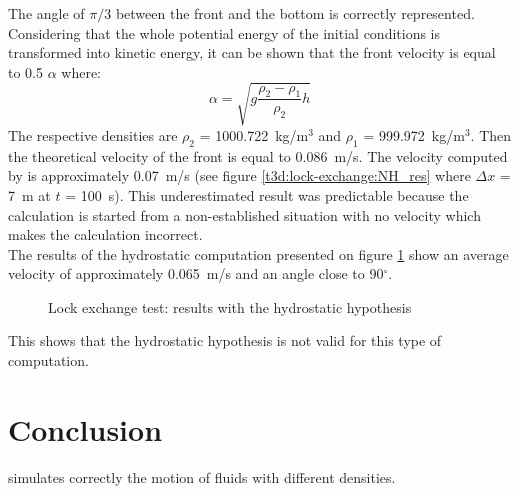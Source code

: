 The angle of $\pi/3$ between the front and the bottom is correctly
represented.\\
Considering that the whole potential energy of the initial conditions is
transformed into kinetic energy, it can be shown that the front velocity
is equal to 0.5 $\alpha$ where:
\begin{equation}
\alpha = \sqrt{g \frac{\rho_2-\rho_1}{\rho_2}h}
\end{equation}
The respective densities are $\rho_2$ = 1000.722~kg/m$^3$
and $\rho_1$ = 999.972~kg/m$^3$.
Then the theoretical velocity of the front is equal to 0.086~m/s.
The velocity computed by  is approximately 0.07~m/s
(see figure \ref{t3d:lock-exchange:NH_res} where $\Delta x$ = 7~m
at $t$ = 100~s).
This underestimated result was predictable because the calculation is
started from a non-established situation with no velocity which makes
the calculation incorrect.\\
The results of the hydrostatic computation presented on figure
\ref{t3d:lock-exchange:hydro_res} show an average velocity of
approximately 0.065~m/s and an angle close to 90$^\circ$.

\begin{figure} [h]
\centering
{}
 \caption{Lock exchange test: results with the hydrostatic hypothesis}
 \label{t3d:lock-exchange:hydro_res}
\end{figure}

This shows that the hydrostatic hypothesis is not valid for this type of
computation.
%
\section{Conclusion}
%
 simulates correctly the motion of fluids with different
densities.
%
